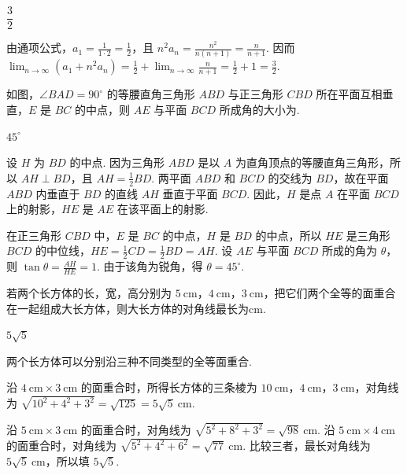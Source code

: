 \begin{answer}
\(\dfrac{3}{2}\)
\end{answer}

\begin{solution}
由通项公式，\(a_1=\frac1{1\cdot2}=\frac12\)，且
\(n^2a_n=\frac{n^2}{n(n+1)}=\frac{n}{n+1}\). 因而
\(\lim_{n\to\infty}(a_1+n^2a_n)=\frac12+\lim_{n\to\infty}\frac{n}{n+1}=\frac12+1=\frac32\).
\end{solution}

\begin{problem}
如图，\(\angle BAD = 90^{\circ}\) 的等腰直角三角形 \(ABD\) 与正三角形 \(CBD\) 所在平面互相垂直，\(E\) 是 \(BC\) 的中点，则 \(AE\) 与平面 \(BCD\) 所成角的大小为\fillinblank{}.

\end{problem}

\begin{answer}
\(45^\circ\)
\end{answer}

\begin{solution}
设 \(H\) 为 \(BD\) 的中点. 因为三角形 \(ABD\) 是以 \(A\) 为直角顶点的等腰直角三角形，所以 \(AH\perp BD\)，且 \(AH=\frac12BD\). 两平面 \(ABD\) 和 \(BCD\) 的交线为 \(BD\)，故在平面 \(ABD\) 内垂直于 \(BD\) 的直线 \(AH\) 垂直于平面 \(BCD\). 因此，\(H\) 是点 \(A\) 在平面 \(BCD\) 上的射影，\(HE\) 是 \(AE\) 在该平面上的射影.

在正三角形 \(CBD\) 中，\(E\) 是 \(BC\) 的中点，\(H\) 是 \(BD\) 的中点，所以 \(HE\) 是三角形 \(BCD\) 的中位线，\(HE=\frac12CD=\frac12BD=AH\). 设 \(AE\) 与平面 \(BCD\) 所成的角为 \(\theta\)，则
\(\tan\theta=\frac{AH}{HE}=1\). 由于该角为锐角，得 \(\theta=45^\circ\).
\end{solution}

\begin{problem}
若两个长方体的长，宽，高分别为 \(5\mathrm{~cm}\)，\(4\mathrm{~cm}\)，\(3\mathrm{~cm}\)，把它们两个全等的面重合在一起组成大长方体，则大长方体的对角线最长为\fillinblank{}\(\mathrm{cm}\).
\end{problem}

\begin{answer}
\(5\sqrt{5}\)
\end{answer}

\begin{solution}
两个长方体可以分别沿三种不同类型的全等面重合.

沿 \(4\mathrm{~cm}\times3\mathrm{~cm}\) 的面重合时，所得长方体的三条棱为 \(10\mathrm{~cm}\)，\(4\mathrm{~cm}\)，\(3\mathrm{~cm}\)，对角线为 \(\sqrt{10^2+4^2+3^2}=\sqrt{125}=5\sqrt5\mathrm{~cm}\).

沿 \(5\mathrm{~cm}\times3\mathrm{~cm}\) 的面重合时，对角线为 \(\sqrt{5^2+8^2+3^2}=\sqrt{98}\mathrm{~cm}\). 沿 \(5\mathrm{~cm}\times4\mathrm{~cm}\) 的面重合时，对角线为 \(\sqrt{5^2+4^2+6^2}=\sqrt{77}\mathrm{~cm}\). 比较三者，最长对角线为 \(5\sqrt5\mathrm{~cm}\)，所以填 \(5\sqrt5\).
\end{solution}

